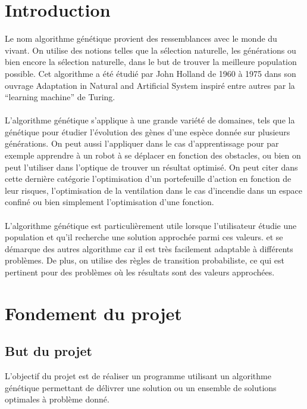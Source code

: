 \documentclass[a4paper,11pt]{article}
\title{\vspace{13em}{\huge Cahier des Charges}}
\author{Edouard Fouassier - Maxime Gonthier - Benjamin Guillot\\
		Laureline Martin - Rémi Navarro - Lydia Rodrigez de la Nava
		\vspace{2em}\\
		Algorithme Génétique
		\vspace{2em}}
\begin{document}
	
	\clearpage
	\maketitle\vspace{13em}
\newpage
\tableofcontents
\newpage\clearpage{}
	
	\section{Introduction}
		Le nom algorithme génétique provient des ressemblances avec le monde du vivant. On utilise des notions telles que la sélection naturelle, les générations ou bien encore la sélection naturelle, dans le but de trouver la meilleure population possible. 
		Cet algorithme a été étudié par John Holland de 1960 à 1975 dans son ouvrage Adaptation in Natural and Artificial System inspiré entre autres par la “learning machine” de Turing.\\
		\\
		L’algorithme génétique s’applique à une grande variété de domaines, tels que la génétique pour étudier l’évolution des gènes d’une espèce donnée sur plusieurs générations. 
		On peut aussi l'appliquer dans le cas d’apprentissage pour par exemple apprendre à un robot à se déplacer en fonction des obstacles, ou bien on peut l'utiliser dans l'optique de trouver un résultat optimisé.
		On peut citer dans cette dernière catégorie l’optimisation d'un portefeuille d'action en fonction de leur risques, l’optimisation de la ventilation dans le cas d'incendie dans un espace confiné ou bien simplement l’optimisation d’une fonction.\\ 
		\\
		L’algorithme génétique est particulièrement utile lorsque l’utilisateur étudie une population et qu’il recherche une solution approchée parmi ces valeurs. 
		et se démarque des autres algorithme car il est très facilement adaptable à différents problèmes. 
		De plus, on utilise des règles de transition probabiliste, ce qui est pertinent pour des problèmes où les résultats sont des valeurs approchées.\\

	\section{Fondement du projet}
		\subsection{But du projet}
			L'objectif du projet est de réaliser un programme utilisant un algorithme génétique permettant de délivrer une solution ou un ensemble de solutions optimales à problème donné.
		
\end{document}
